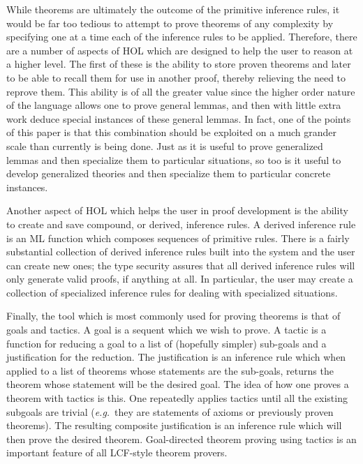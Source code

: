 While theorems are ultimately the outcome of the primitive inference
rules, it would be far too tedious to attempt to prove theorems of any
complexity by specifying one at a time each of the inference rules to
be applied.  Therefore, there are a number of aspects of HOL which are
designed to help the user to reason at a higher level.  The first of
these is the ability to store proven theorems and later to be able to
recall them for use in another proof, thereby relieving the need to
reprove them.  This ability is of all the greater value since the
higher order nature of the language allows one to prove general
lemmas, and then with little extra work deduce special instances of
these general lemmas.  In fact, one of the points of this paper is
that this combination should be exploited on a much grander scale than
currently is being done.  Just as it is useful to prove generalized
lemmas and then specialize them to particular situations, so too is it
useful to develop generalized theories and then specialize them to
particular concrete instances.

Another aspect of HOL which helps the user in proof development is the
ability to create and save compound, or derived, inference rules.  A
derived inference rule is an ML function which composes sequences of
primitive rules.  There is a fairly substantial collection of derived
inference rules built into the system and the user can create new
ones; the type security assures that all derived inference rules will
only generate valid proofs, if anything at all.  In particular, the
user may create a collection of specialized inference rules for
dealing with specialized situations.

Finally, the tool which is most commonly used for proving theorems is
that of goals and tactics.  A goal is a sequent which we wish to
prove.  A tactic is a function for reducing a goal to a list of
(hopefully simpler) sub-goals and a justification for the reduction.
The justification is an inference rule which when applied to a list of
theorems whose statements are the sub-goals, returns the theorem whose
statement will be the desired goal.  The idea of how one proves a
theorem with tactics is this.  One repeatedly applies tactics until
all the existing subgoals are trivial ({\it e.g.}~they are statements
of axioms or previously proven theorems).  The resulting composite
justification is an inference rule which will then prove the desired
theorem.  Goal-directed theorem proving using tactics is an important
feature of all LCF-style theorem provers.


